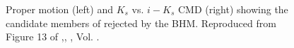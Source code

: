 \begin{figure}[ht!]
\begin{center}
\caption{Proper motion (left) and $K_s$ vs. $i-K_s$ CMD (right) showing the candidate members of \citet{Bouy2015} rejected by the BHM. Reproduced from Figure 13 of \citet{Olivares2017},\textit{}, , Vol. .}
\label{fig:rejecteds}
\end{center}
\end{figure}

\begin{figure}[htbp]
\begin{center}

\end{center}
\end{figure}
